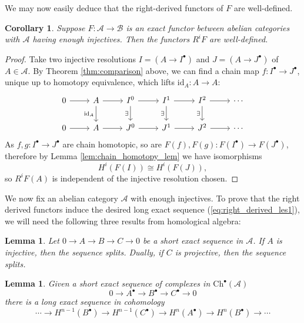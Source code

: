 \documentclass{article}
\def\~#1{\mathscr{#1}}
\numberwithin{equation}{section}
\numberwithin{figure}{section}
\newcommand{\id}{\mathrm{id}}
\newcommand{\Ch}{\mathrm{Ch}}
\theoremstyle{plain}
\newtheorem{lem}[thm]{Lemma}
\newtheorem{cor}[thm]{Corollary}
\theoremstyle{definition}
\theoremstyle{remark}
\begin{document}
We may now easily deduce that the right-derived functors of $F$ are well-defined.
\begin{cor}
    Suppose $F: \~A \to \~B$ is an exact functor between abelian categories with $\~A$ having enough injectives. Then the functors $R^iF$ are well-defined.
\end{cor}
\begin{proof}
Take two injective resolutions $I = (A \to I^\bullet)$ and $J = (A \to J^\bullet)$ of $A \in \~A$. By Theorem \ref{thm:comparison} above, we can find a chain map $f: I^\bullet \to J^\bullet$, unique up to homotopy equivalence, which lifts $\id_A: A \to A$:
     \[\begin{tikzcd}
    0 & A & {I^0} & {I^1} & {I^2} & \cdots \\
    0 & A & {J^0} & {J^1} & {J^2} & \cdots
    \arrow[from=1-1, to=1-2]
    \arrow[from=1-2, to=1-3]
    \arrow["{\id_A}"', from=1-2, to=2-2]
    \arrow[from=1-3, to=1-4]
    \arrow["\exists"', from=1-3, to=2-3]
    \arrow[from=1-4, to=1-5]
    \arrow["\exists"', from=1-4, to=2-4]
    \arrow[from=1-5, to=1-6]
    \arrow["\exists"', from=1-5, to=2-5]
    \arrow[from=2-1, to=2-2]
    \arrow[from=2-2, to=2-3]
    \arrow[from=2-3, to=2-4]
    \arrow[from=2-4, to=2-5]
    \arrow[from=2-5, to=2-6]
\end{tikzcd}\]
As $f, g: I^\bullet \to J^\bullet$ are chain homotopic, so are $F(f), F(g): F(I^\bullet) \to F(J^\bullet)$, therefore by Lemma \ref{lem:chain_homotopy_lem} we have isomorphisms 
\[H^i(F(I)) \cong H^i(F(J)),\]
so $R^iF(A)$ is independent of the injective resolution chosen.
\end{proof}

We now fix an abelian category $\~A$ with enough injectives. To prove that the right derived functors induce the desired long exact sequence (\ref{eq:right_derived_les1}), we will need the following three results from homological algebra:
\begin{lem}\label{lem:inj_proj_ses}
    Let $0 \to A \to B \to C \to 0$ be a short exact sequence in $\~A$. If $A$ is injective, then the sequence splits. Dually, if $C$ is projective, then the sequence splits. 
\end{lem}
\begin{lem}\label{lem:les_on_cohomology}
    Given a short exact sequence of complexes in $\Ch^\bullet(\~A)$
    \[0 \to A^\bullet \to B^\bullet \to C^\bullet \to 0\]
    there is a long exact sequence in cohomology
    \[\cdots \to H^{n-1}(B^\bullet) \to H^{n-1}(C^\bullet) \to H^n(A^\bullet) \to H^n(B^\bullet) \to \cdots\]
\end{lem}
\end{document}
